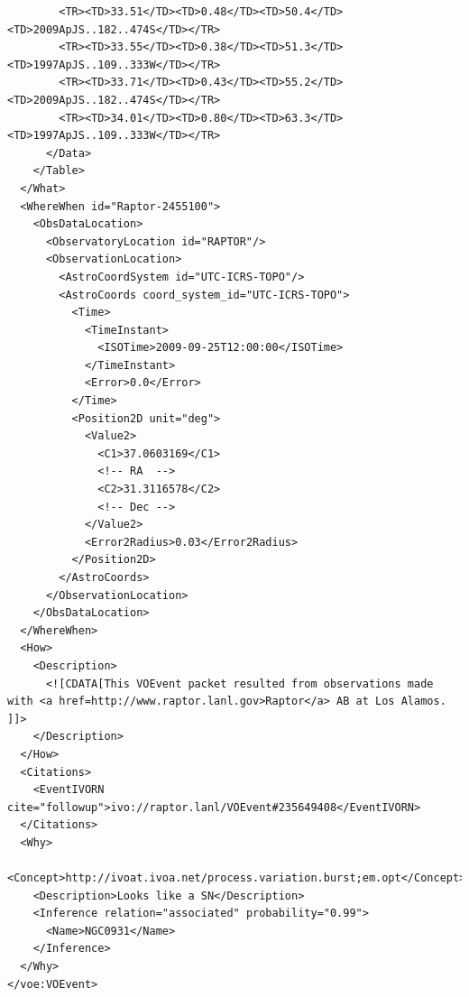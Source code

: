 \documentclass[11pt,a4paper]{ivoa}
\begin{document}
{\begin{verbatim}
        <TR><TD>33.51</TD><TD>0.48</TD><TD>50.4</TD><TD>2009ApJS..182..474S</TD></TR>
        <TR><TD>33.55</TD><TD>0.38</TD><TD>51.3</TD><TD>1997ApJS..109..333W</TD></TR>
        <TR><TD>33.71</TD><TD>0.43</TD><TD>55.2</TD><TD>2009ApJS..182..474S</TD></TR>
        <TR><TD>34.01</TD><TD>0.80</TD><TD>63.3</TD><TD>1997ApJS..109..333W</TD></TR>
      </Data>
    </Table>
  </What>
  <WhereWhen id="Raptor-2455100">
    <ObsDataLocation>
      <ObservatoryLocation id="RAPTOR"/>
      <ObservationLocation>
        <AstroCoordSystem id="UTC-ICRS-TOPO"/>
        <AstroCoords coord_system_id="UTC-ICRS-TOPO">
          <Time>
            <TimeInstant>
              <ISOTime>2009-09-25T12:00:00</ISOTime>
            </TimeInstant>
            <Error>0.0</Error>
          </Time>
          <Position2D unit="deg">
            <Value2>
              <C1>37.0603169</C1>
              <!-- RA  -->
              <C2>31.3116578</C2>
              <!-- Dec -->
            </Value2>
            <Error2Radius>0.03</Error2Radius>
          </Position2D>
        </AstroCoords>
      </ObservationLocation>
    </ObsDataLocation>
  </WhereWhen>
  <How>
    <Description>
      <![CDATA[This VOEvent packet resulted from observations made with <a href=http://www.raptor.lanl.gov>Raptor</a> AB at Los Alamos. ]]>
    </Description>
  </How>
  <Citations>
    <EventIVORN cite="followup">ivo://raptor.lanl/VOEvent#235649408</EventIVORN>
  </Citations>
  <Why>
    <Concept>http://ivoat.ivoa.net/process.variation.burst;em.opt</Concept>
    <Description>Looks like a SN</Description>
    <Inference relation="associated" probability="0.99">
      <Name>NGC0931</Name>
    </Inference>
  </Why>
</voe:VOEvent>
\end{verbatim}}
\end{document}
